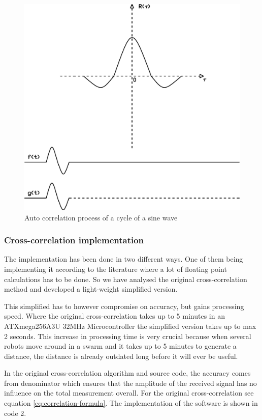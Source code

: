 \documentclass[10pt,a4paper]{article}
\begin{document}
\begin{figure}[H]
   \centering
   \includegraphics[width=\textwidth]{correlation.pdf}
   \caption{Auto correlation process of a cycle of a sine wave}
   \label{fig:correlation}
\end{figure}

\subsubsection{Cross-correlation implementation}
The implementation has been done in two different ways. One of them being implementing it according to the literature where a lot of floating point calculations has to be done. So we have analysed the original cross-correlation method and developed a light-weight simplified version.

This simplified has to however compromise on accuracy, but gains processing speed. Where the original cross-correlation takes up to 5 minutes in an ATXmega256A3U 32MHz Microcontroller the simplified version takes up to max 2 seconds. This increase in processing time is very crucial because when several robots move around in a swarm and it takes up to 5 minutes to generate a distance, the distance is already outdated long before it will ever be useful.

In the original cross-correlation algorithm and source code, the accuracy comes from denominator which ensures that the amplitude of the received signal has no influence on the total measurement overall. For the original cross-correlation see equation \ref{eq:correlation-formula}. The implementation of the software is shown in code 2.
\end{document}
